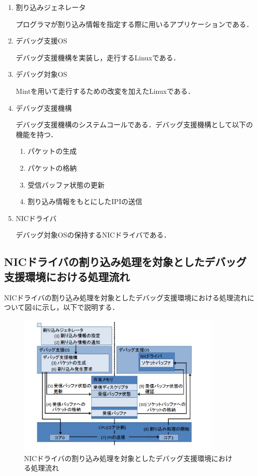 \documentclass[12pt]{jsarticle}
\begin{document}
\begin{enumerate}
\item 割り込みジェネレータ

プログラマが割り込み情報を指定する際に用いるアプリケーションである．
\item デバッグ支援OS

デバッグ支援機構を実装し，走行するLinuxである．
\item デバッグ対象OS

Mintを用いて走行するための改変を加えたLinuxである．
\item デバッグ支援機構

デバッグ支援機構のシステムコールである．デバッグ支援機構として以下の機能を持つ．
\begin{enumerate}
\item パケットの生成
\item パケットの格納
\item 受信バッファ状態の更新
\item 割り込み情報をもとにしたIPIの送信
\end{enumerate}
\item NICドライバ

デバッグ対象OSの保持するNICドライバである．
\end{enumerate}
\subsection{NICドライバの割り込み処理を対象としたデバッグ支援環境における処理流れ}
NICドライバの割り込み処理を対象としたデバッグ支援環境における処理流れについて図4に示し，以下で説明する．


\begin{figure}[t]
\begin{center}
\includegraphics[height=7.0cm]{./fig4.jpg}          
\caption{NICドライバの割り込み処理を対象としたデバッグ支援環境における処理流れ}
\label{fig:up}
\end{center}
\end{figure}
\end{document}

